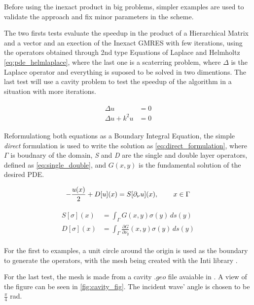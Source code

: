 Before using the inexact product in big problems, simpler examples are used to validate the approach and fix minor parameters in the scheme.

The two firsts tests evaluate the speedup in the product of a Hierarchical Matrix and a vector and an exection of the Inexact GMRES with few iterations, using the operators obtained through 2nd type Equations of Laplace and Helmholtz \ref{eq:pde_helmlaplace}, where the last one is a scaterring problem, where $\Delta$ is the Laplace operator and everything is suposed to be solved in two dimentions. The last test will use a cavity problem to test the speedup of the algorithm in a situation with more iterations.

\begin{align}\label{eq:pde_helmlaplace}
    \begin{split}
        \Delta u &= 0 \\
        \Delta u + k^{2}u &= 0
    \end{split}
\end{align}

Reformulationg both equations as a Boundary Integral Equation, the simple \textit{direct} formulation is used to write the solution as \ref{eq:direct_formulation}, where $\Gamma$ is boudnary of the domain, \textit{S} and \textit{D} are the single and double layer operators, defined as \ref{eq:single_double}, and $G(x,y)$ is the fundamental solution of the desired PDE.

\begin{equation}\label{eq:direct_formulation}
    -\frac{u(x)}{2} + D[u](x) = S[\partial_{\nu }u] (x), \hspace{0.3in} x \in \Gamma
\end{equation}

\begin{align}\label{eq:single_double}
    \begin{split}
        S[\sigma](x) &= \int_{\Gamma} G(x,y) \sigma(y)  \,ds(y) \\
        D[\sigma](x) &= \int_{\Gamma} \frac{\partial G}{\partial \nu_{y}}(x,y) \sigma(y)  \,ds(y)
    \end{split}
\end{align}

For the first to examples, a unit circle around the origin is used as the boundary to generate the operators, with the mesh being created with the Inti library \cite{git-inti}.

For the last test, the mesh is made from a cavity $.geo$ file avaiable in \cite{git_dudu}. A view of the figure can be seen in \ref{fig:cavity_fig}. The incident wave' angle is chosen to be $\frac{\pi}{4}$ rad.

